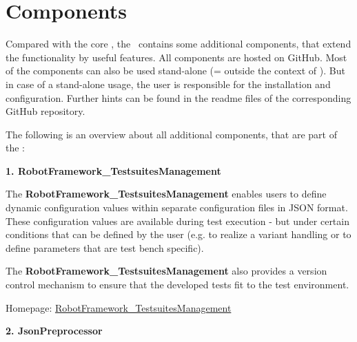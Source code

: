 %
%
%

\chapter{Components}

Compared with the core \rfwcore, the \rfw\ contains some additional components, that extend the functionality by useful features.
All components are hosted on GitHub. Most of the components can also be used stand-alone (= outside the context of \rfw). But in case of a stand-alone
usage, the user is responsible for the installation and configuration. Further hints can be found in the readme files of the corresponding GitHub repository.

The following is an overview about all additional components, that are part of the \rfw:

\vspace{2ex}

\textbf{1. RobotFramework\_TestsuitesManagement}

The \textbf{RobotFramework\_TestsuitesManagement} enables users to define dynamic configuration values within separate configuration
files in JSON format. These configuration values are available during test execution - but under certain conditions that can be defined by
the user (e.g. to realize a variant handling or to define parameters that are test bench specific).

The \textbf{RobotFramework\_TestsuitesManagement} also provides a version control mechanism to ensure that the developed tests fit to the test environment.

Homepage: \href{https://github.com/test-fullautomation/robotframework-testsuitesmanagement}{RobotFramework\_TestsuitesManagement}

\vspace{2ex}

\textbf{2. JsonPreprocessor}


